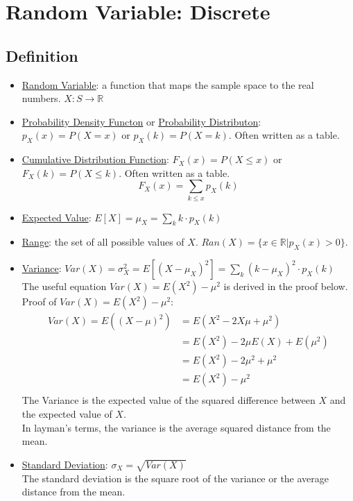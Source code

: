 \documentclass[12pt]{article}
\begin{document}
    \section{Random Variable: Discrete}
        \subsection{Definition}
            \begin{itemize}
                \item \underline{Random Variable}: a function that maps the sample space to the real numbers. $X: S \rightarrow \mathbb{R}$
                \item \underline{Probability Density Functon} or \underline{Probability Distributon}: $p_X(x) = P(X = x)$ or $p_X(k) = P(X = k)$. Often written as a table.
                \item \underline{Cumulative Distribution Function}: $F_X(x) = P(X \leq x)$ or $F_X(k) = P(X \leq k)$. Often written as a table. \\
                \begin{equation}
                    F_X(x) = \sum_{k \leq x} p_X(k)
                \end{equation}
                \item \underline{Expected Value}: $E[X] = \mu_X = \sum_{k} k \cdot p_X(k)$
                \item \underline{Range}: the set of all possible values of $X$. $Ran(X) = \{x \in \mathbb{R} | p_X(x) > 0\}$.
                \item \underline{Variance}: $Var(X) = \sigma_X^2 = E[{(X - \mu_X)}^2] = \sum_{k} {(k - \mu_X)}^2 \cdot p_X(k)$ \\
                The useful equation $Var(X) = E(X^2) - \mu^2$ is derived in the proof below. \\
                Proof of $Var(X) = E(X^2) - \mu^2$:
                \begin{align*}
                    Var(X) = E({(X-\mu)}^2)
                    &= E(X^2 - 2X\mu + \mu^2) \\
                    &= E(X^2) - 2\mu{}E(X) + E(\mu^2) \\
                    &= E(X^2) - 2\mu^2 + \mu^2 \\
                    &= E(X^2) - \mu^2 \\
                \end{align*}
                The Variance is the expected value of the squared difference between $X$ and the expected value of $X$. \\
                In layman's terms, the variance is the average squared distance from the mean.
                \item \underline{Standard Deviation}: $\sigma_X = \sqrt{Var(X)}$ \\
                The standard deviation is the square root of the variance or the average distance from the mean.
            \end{itemize}
\end{document}
